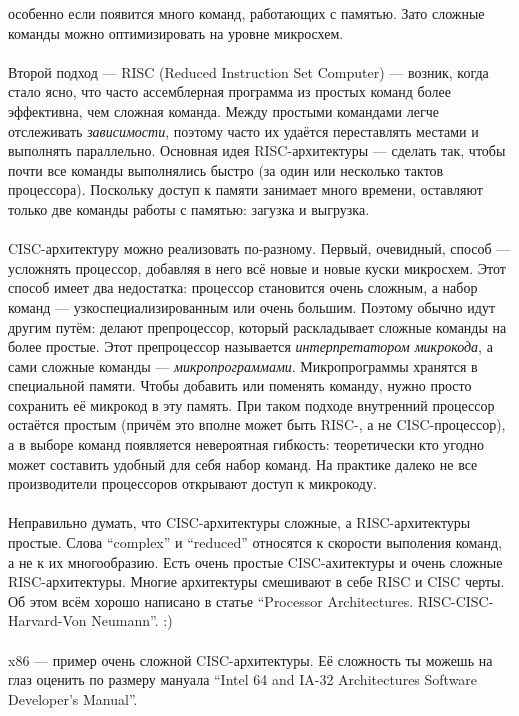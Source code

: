 \documentclass[11pt]{book}
\begin{document}
особенно если появится много команд, работающих с памятью.
Зато сложные команды можно оптимизировать на уровне микросхем.
\\ \\
Второй подход --- RISC (Reduced Instruction Set Computer) --- возник, когда стало ясно, что часто ассемблерная программа из простых команд
более эффективна, чем сложная команда. Между простыми командами легче отслеживать \emph{зависимости},
поэтому часто их удаётся переставлять местами и выполнять параллельно.
Основная идея RISC-архитектуры --- сделать так, чтобы почти все команды выполнялись быстро (за один или несколько тактов процессора).
Поскольку доступ к памяти занимает много времени, оставляют только две команды работы с памятью: загузка и выгрузка.
\\ \\
CISC-архитектуру можно реализовать по-разному.
Первый, очевидный, способ --- усложнять процессор, добавляя в него всё новые и новые куски микросхем.
Этот способ имеет два недостатка: процессор становится очень сложным, а набор команд --- узкоспециализированным или очень большим.
Поэтому обычно идут другим путём: делают препроцессор, который раскладывает сложные команды на более простые.
Этот препроцессор называется \emph{интерпретатором микрокода}, а сами сложные команды --- \emph{микропрограммами}.
Микропрограммы хранятся в специальной памяти.
Чтобы добавить или поменять команду, нужно просто сохранить её микрокод в эту память.
При таком подходе внутренний процессор остаётся простым (причём это вполне может быть RISC-, а не CISC-процессор),
а в выборе команд появляется невероятная гибкость: теоретически кто угодно может составить удобный для себя набор команд.
На практике далеко не все производители процессоров открывают доступ к микрокоду.
\\ \\
Неправильно думать, что CISC-архитектуры сложные, а RISC-архитектуры простые.
Слова ``complex'' и ``reduced'' относятся к скорости выполения команд, а не к их многообразию.
Есть очень простые CISC-ахитектуры и очень сложные RISC-архитектуры.
Многие архитектуры смешивают в себе RISC и CISC черты.
Об этом всём хорошо написано в статье ``Processor Architectures. RISC-CISC-Harvard-Von Neumann''. :)
\\ \\
x86 --- пример очень сложной CISC-архитектуры.
Её сложность ты можешь на глаз оценить по размеру мануала ``Intel 64 and IA-32 Architectures Software Developer's Manual''.
\\ \\
\end{document}
